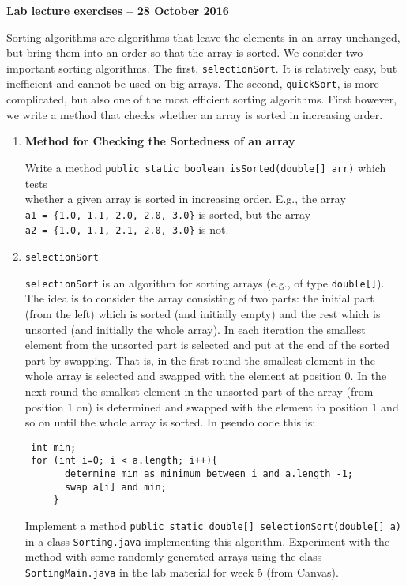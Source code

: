 \documentclass[12pt]{article}
\newcommand{\myhead}[1]{\begin{center}\large\bf #1\end{center}}
\begin{document}
\myhead{Lab lecture exercises -- 28 October 2016}

\noindent Sorting algorithms are algorithms that leave the elements in an array
unchanged, but bring them into an order so that the array is sorted.
We consider two important sorting algorithms. The first,
\texttt{selectionSort}. It is relatively easy, but inefficient and cannot be
used on big arrays. The second, \texttt{quickSort}, is more
complicated, but also one of the most efficient sorting algorithms.
First however, we write a method that checks whether an array is
sorted in increasing order.



\begin{enumerate}
\item \textbf{Method for Checking the Sortedness of an array}

Write a method \texttt{public static boolean isSorted(double[] arr)} which tests\\ whether a given array is sorted in increasing order. E.g., the array\\
\verb|a1 = {1.0, 1.1, 2.0, 2.0, 3.0}| is sorted, but the array\\
\verb|a2 = {1.0, 1.1, 2.1, 2.0, 3.0}| is not.\bigskip

\item \texttt{selectionSort}

  \texttt{selectionSort} is an algorithm for sorting arrays (e.g., of
  type \texttt{double[]}). The idea is to consider the array
  consisting of two parts: the initial part (from the left) which is
  sorted (and initially empty) and the rest which is unsorted (and
  initially the whole array). In each iteration the smallest element
  from the unsorted part is selected and put at the end of the sorted
  part by swapping. That is, in the first round the smallest element
  in the whole array is selected and swapped with the element at
  position 0. In the next round the smallest element in the unsorted
  part of the array (from position 1 on) is determined and swapped
  with the element in position 1 and so on until the whole array is
  sorted.  In pseudo code this is:
\begin{verbatim}
 int min;
 for (int i=0; i < a.length; i++){
       determine min as minimum between i and a.length -1;
       swap a[i] and min;
     }
\end{verbatim}
  Implement a method \texttt{public static double[]
    selectionSort(double[] a)} in a class \texttt{Sorting.java}
  implementing this algorithm.  Experiment with the method with some
  randomly generated arrays using the class \texttt{SortingMain.java}
  in the lab material for week 5 (from Canvas).\newpage


\end{enumerate}
\end{document}

